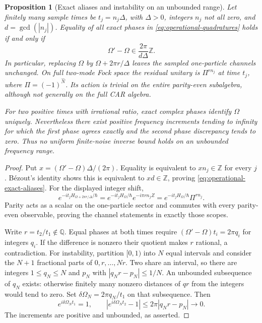 \documentclass[11pt]{article}
\newtheorem{proposition}[theorem]{Proposition}
\theoremstyle{definition}
\begin{document}
\begin{proposition}[Exact aliases and instability on an unbounded range]
\label{prop:operational-aliases}
Let finitely many sample times be $t_j=n_j\Delta$, with $\Delta>0$,
integers $n_j$ not all zero, and $d=\gcd(|n_j|)$. Equality of all exact
phases in \eqref{eq:operational-quadratures} holds if and only if
\begin{equation}
 \Omega'-\Omega\in\frac{2\pi}{d\Delta}\mathbb Z.
 \label{eq:operational-exact-aliases}
\end{equation}
In particular, replacing $\Omega$ by $\Omega+2\pi r/\Delta$ leaves the
sampled one-particle channels unchanged. On full two-mode Fock space
the residual unitary is $\Pi^{rn_j}$ at time $t_j$, where
$\Pi=(-1)^{\widehat N}$. Its action is trivial on the entire parity-even
subalgebra, although not generally on the full CAR algebra.

For two positive times with irrational ratio, exact complex phases
identify $\Omega$ uniquely. Nevertheless there exist positive frequency
increments tending to infinity for which the first phase agrees exactly
and the second phase discrepancy tends to zero. Thus no uniform
finite-noise inverse bound holds on an unbounded frequency range.
\end{proposition}
\begin{proof}
Put $x=(\Omega'-\Omega)\Delta/(2\pi)$. Equality is equivalent to
$xn_j\in\mathbb Z$ for every $j$. B\'ezout's identity shows this is
equivalent to $xd\in\mathbb Z$, proving
\eqref{eq:operational-exact-aliases}. For the displayed integer shift,
\[
 e^{-it_jH_{\Omega+2\pi r/\Delta}/\hbar}
 =e^{-it_jH_\Omega/\hbar}e^{-i\pi rn_jZ}
 =e^{-it_jH_\Omega/\hbar}\Pi^{rn_j}.
\]
Parity acts as a scalar on the one-particle sector and commutes with
every parity-even observable, proving the channel statements in exactly
those scopes.

Write $r=t_2/t_1\notin\mathbb Q$. Equal phases at both times require
$(\Omega'-\Omega)t_i=2\pi q_i$ for integers $q_i$. If the difference is
nonzero their quotient makes $r$ rational, a contradiction. For
instability, partition $[0,1)$ into $N$ equal intervals and consider the
$N+1$ fractional parts of $0,r,\ldots,Nr$. Two share an interval, so
there are integers $1\le q_N\le N$ and $p_N$ with
$|q_Nr-p_N|\le1/N$. An unbounded subsequence of $q_N$ exists: otherwise
finitely many nonzero distances of $qr$ from the integers would tend
to zero. Set $\delta\Omega_N=2\pi q_N/t_1$ on that subsequence. Then
\[
 e^{i\delta\Omega_Nt_1}=1,\qquad
 |e^{i\delta\Omega_Nt_2}-1|
 \le2\pi|q_Nr-p_N|\longrightarrow0.
\]
The increments are positive and unbounded, as asserted.
\end{proof}
\end{document}
